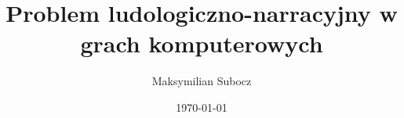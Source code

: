\documentclass{beamer}
\title{Problem ludologiczno-narracyjny w grach komputerowych}
\author{Maksymilian Subocz}
\date{\today}
\begin{document}
\frame{\titlepage}







\end{document}
